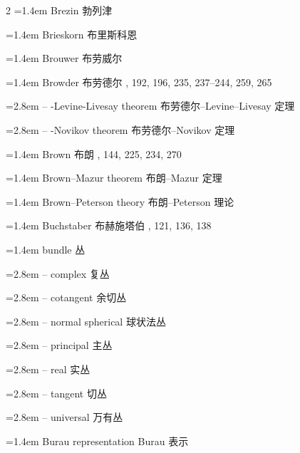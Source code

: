 \begin{multicols}{2}
\noindent\hangindent=1.4em Brezin \quad 勃列津 \par
\noindent\hangindent=1.4em Brieskorn \quad 布里斯科恩 \par
\noindent\hangindent=1.4em Brouwer \quad 布劳威尔 \par
\noindent\hangindent=1.4em Browder \quad 布劳德尔 , 192, 196, 235, 237--244, 259, 265\par
\noindent\hangindent=2.8em -- -Levine-Livesay theorem \quad 布劳德尔--Levine--Livesay 定理 \par
\noindent\hangindent=2.8em -- -Novikov theorem \quad 布劳德尔--Novikov 定理 \par
\noindent\hangindent=1.4em Brown \quad 布朗 , 144, 225, 234, 270\par
\noindent\hangindent=1.4em Brown--Mazur theorem \quad 布朗--Mazur 定理 \par
\noindent\hangindent=1.4em Brown--Peterson theory \quad 布朗--Peterson 理论 \par
\noindent\hangindent=1.4em Buchstaber \quad 布赫施塔伯 , 121, 136, 138\par
\noindent\hangindent=1.4em bundle \quad 丛 \quad\par
\noindent\hangindent=2.8em -- complex \quad 复丛 \par
\noindent\hangindent=2.8em -- cotangent \quad 余切丛 \par
\noindent\hangindent=2.8em -- normal spherical \quad 球状法丛 \par
\noindent\hangindent=2.8em -- principal \quad 主丛 \par
\noindent\hangindent=2.8em -- real \quad 实丛 \par
\noindent\hangindent=2.8em -- tangent \quad 切丛 \par
\noindent\hangindent=2.8em -- universal \quad 万有丛 \par
\noindent\hangindent=1.4em Burau representation \quad Burau 表示 \par
\end{multicols}

